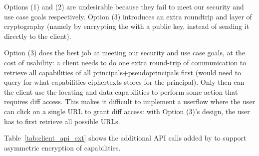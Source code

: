 Options (1) and (2) are undesirable because they fail to meet our security and use case goals
respectively.
Option (3) introduces an extra roundtrip and layer of cryptography (namely by encrypting
the  with a public key, instead of sending it directly to the client). 

Option (3) does the best job at meeting our security and use case goals, at the cost of usability:
a client needs to do one extra round-trip of communication to retrieve all capabilities of
all principals+pseudoprincipals first (\ie would need to query for what capabilities ciphertexts
\sys stores for the principal). Only then can the client use the locating and data capabilities to
perform some action that requires \sys diff access. This makes it difficult to implement a userflow
where the user can click on a single URL to grant \sys diff access: with Option (3)'s design, the user has to first retrieve
all possible URLs.

Table~\ref{tab:client_api_ext} shows the additional API calls added by \sys to support asymmetric
encryption of capabilities. 


